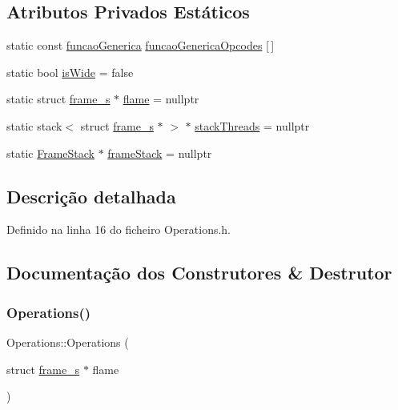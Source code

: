\subsection*{Atributos Privados Estáticos}
\begin{DoxyCompactItemize}
\item 
static const \hyperlink{Operations_8h_a41b02f2392b85fc1d04e0d8e11c43398}{funcao\+Generica} \hyperlink{classOperations_a7cb32c09e40f348cabf0b7af374ad278}{funcao\+Generica\+Opcodes} \mbox{[}$\,$\mbox{]}
\item 
static bool \hyperlink{classOperations_a672ba6cc2178cbc5b0a434b08de4c608}{is\+Wide} = false
\item 
static struct \hyperlink{structframe__s}{frame\+\_\+s} $\ast$ \hyperlink{classOperations_a578012ad7aafe27db149c6e421bef1a6}{flame} = nullptr
\item 
static stack$<$ struct \hyperlink{structframe__s}{frame\+\_\+s} $\ast$ $>$ $\ast$ \hyperlink{classOperations_af0867c8994e496c70f9c3157eeb8a287}{stack\+Threads} = nullptr
\item 
static \hyperlink{classFrameStack}{Frame\+Stack} $\ast$ \hyperlink{classOperations_a72ff498d126bb8082b3ac70ccb6e953a}{frame\+Stack} = nullptr
\end{DoxyCompactItemize}


\subsection{Descrição detalhada}


Definido na linha 16 do ficheiro Operations.\+h.



\subsection{Documentação dos Construtores \& Destrutor}
\mbox{\label{classOperations_af4742b57ed46ed1d0bc96629cdf219b2}} 
\subsubsection{\texorpdfstring{Operations()}{Operations()}}
{\footnotesize\ttfamily Operations\+::\+Operations (\begin{DoxyParamCaption}\item[{struct \hyperlink{structframe__s}{frame\+\_\+s} $\ast$}]{flame }\end{DoxyParamCaption})}



